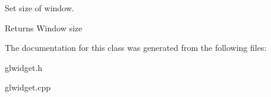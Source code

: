 Set size of window. 

\begin{DoxyReturn}{Returns}
Window size 
\end{DoxyReturn}


The documentation for this class was generated from the following files\+:\begin{DoxyCompactItemize}
\item 
glwidget.\+h\item 
glwidget.\+cpp\end{DoxyCompactItemize}
